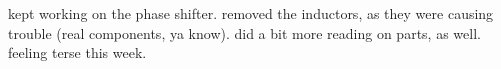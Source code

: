 kept working on the phase shifter. removed the inductors, as they were causing
trouble (real components, ya know). did a bit more reading on parts, as well.
feeling terse this week.
